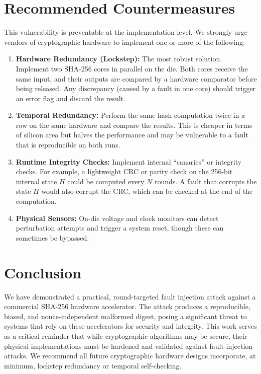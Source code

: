 \documentclass[11pt, a4paper]{article}
\begin{document}
\section{Recommended Countermeasures}
This vulnerability is preventable at the implementation level. We strongly urge vendors of cryptographic hardware to implement one or more of the following:
\begin{enumerate}
    \item \textbf{Hardware Redundancy (Lockstep):} The most robust solution. Implement two SHA-256 cores in parallel on the die. Both cores receive the same input, and their outputs are compared by a hardware comparator before being released. Any discrepancy (caused by a fault in one core) should trigger an error flag and discard the result.
    \item \textbf{Temporal Redundancy:} Perform the same hash computation twice in a row on the same hardware and compare the results. This is cheaper in terms of silicon area but halves the performance and may be vulnerable to a fault that is reproducible on both runs.
    \item \textbf{Runtime Integrity Checks:} Implement internal ``canaries'' or integrity checks. For example, a lightweight CRC or parity check on the 256-bit internal state $H$ could be computed every $N$ rounds. A fault that corrupts the state $H$ would also corrupt the CRC, which can be checked at the end of the computation.
    \item \textbf{Physical Sensors:} On-die voltage and clock monitors can detect perturbation attempts and trigger a system reset, though these can sometimes be bypassed.
\end{enumerate}

\section{Conclusion}
We have demonstrated a practical, round-targeted fault injection attack against a commercial SHA-256 hardware accelerator. The attack produces a reproducible, biased, and nonce-independent malformed digest, posing a significant threat to systems that rely on these accelerators for security and integrity. This work serves as a critical reminder that while cryptographic algorithms may be secure, their physical implementations must be hardened and validated against fault-injection attacks. We recommend all future cryptographic hardware designs incorporate, at minimum, lockstep redundancy or temporal self-checking.
\end{document}
